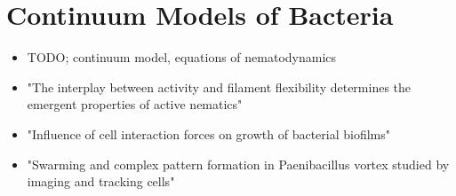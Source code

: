 \section{Continuum Models of Bacteria}

\begin{itemize}
    \item \cite{Volfson2008} TODO; continuum model, equations of nematodynamics \cite{Doi1988-ad}
    \item \cite{Joshi2019} "The interplay between activity and filament flexibility determines the
        emergent properties of active nematics"
    \item \cite{Jin2020} "Influence of cell interaction forces on growth of bacterial biofilms"
    \item \cite{Ingham2008} "Swarming and complex pattern formation in Paenibacillus vortex studied
        by imaging and tracking cells"
\end{itemize}
